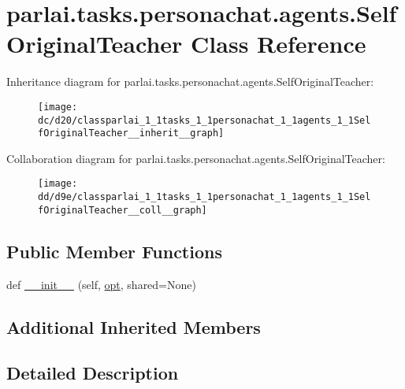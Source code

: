 \hypertarget{classparlai_1_1tasks_1_1personachat_1_1agents_1_1SelfOriginalTeacher}{}\section{parlai.\+tasks.\+personachat.\+agents.\+Self\+Original\+Teacher Class Reference}
\label{classparlai_1_1tasks_1_1personachat_1_1agents_1_1SelfOriginalTeacher}


Inheritance diagram for parlai.\+tasks.\+personachat.\+agents.\+Self\+Original\+Teacher\+:
\nopagebreak
\begin{figure}[H]
\begin{center}
\leavevmode
\texttt{[image: dc/d20/classparlai\_1\_1tasks\_1\_1personachat\_1\_1agents\_1\_1SelfOriginalTeacher\_\_inherit\_\_graph]}
\end{center}
\end{figure}


Collaboration diagram for parlai.\+tasks.\+personachat.\+agents.\+Self\+Original\+Teacher\+:
\nopagebreak
\begin{figure}[H]
\begin{center}
\leavevmode
\texttt{[image: dd/d9e/classparlai\_1\_1tasks\_1\_1personachat\_1\_1agents\_1\_1SelfOriginalTeacher\_\_coll\_\_graph]}
\end{center}
\end{figure}
\subsection*{Public Member Functions}
\begin{DoxyCompactItemize}
\item 
def \hyperlink{classparlai_1_1tasks_1_1personachat_1_1agents_1_1SelfOriginalTeacher_af64af069e88580a3365782e747637a01}{\+\_\+\+\_\+init\+\_\+\+\_\+} (self, \hyperlink{classparlai_1_1core_1_1teachers_1_1FbDialogTeacher_af7a9ec497b9cd0292d7b8fa220da7c28}{opt}, shared=None)
\end{DoxyCompactItemize}
\subsection*{Additional Inherited Members}


\subsection{Detailed Description}


